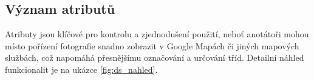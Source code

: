 \subsection{Význam atributů}
Atributy jsou klíčové pro kontrolu a zjednodušení použití, neboť anotátoři mohou místo pořízení fotografie snadno zobrazit v Google Mapách či jiných mapových službách, což napomáhá přesnějšímu označování a určování tříd. Detailní náhled funkcionalit je na ukázce \vref{fig:ds_nahled}.


